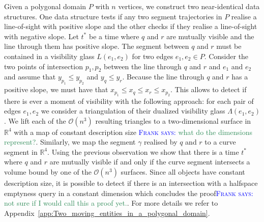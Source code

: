 \documentclass[UKenglish]{lipics-v2019}
\newcommand{\myremark}[4]{\textcolor{blue}{\textsc{#1 #2:}} \textcolor{#4}{\textsf{#3}}}
\newcommand{\frank}[2][says]{\myremark{Frank}{#1}{#2}{SeaGreen}}
\begin{document}
Given a polygonal domain $P$ with $n$ vertices, we construct two near-identical data structures. One data structure tests if any two segment trajectories in $P$ realise a line-of-sight with positive slope and the other checks if they realise a line-of-sight with negative slope. Let $t^*$ be a time where $q$ and $r$ are mutually visible and the line through them has positive slope. The segment between $q$ and $r$ must be contained in a visibility glass $L(e_1, e_2)$ for two edges $e_1, e_2 \in P$. Consider the two points of intersection $p_1, p_2$ between the line through $q$ and $r$ and $e_1$ and $e_2$  and assume that $y_{p_1} \le y_{p_2}$ and $y_q \le y_r$. Because the line through $q$ and $r$ has a positive slope, we must have that $x_{p_1} \le x_{q} \le x_{r} \le x_{p_2}$.
This allows to detect if there is ever a moment of visibility with the
following approach: for each pair of edges $e_1, e_2$ we consider a
triangulation of their dualized visibility glass $\Lambda(e_1,
e_2)$. We lift each of the $\mathcal{O}(n^3)$ resulting triangles to a
two-dimensional surface in $\mathbb{R}^4$ with a map of constant
description size \frank{what do the dimensions represent?}. Similarly,
we map the segment $\gamma$ realised by $q$ and $r$ to a curve segment
in $\mathbb{R}^4$. Using the previous observation we show that there
is a time $t^*$ where $q$ and $r$ are mutually visible if and only if
the curve segment intersects a volume bound by one of the
$\mathcal{O}(n^3)$ surfaces. Since all objects have constant
description size, it is possible to detect if there is an intersection
with a halfspace emptyness query in a constant dimension which
concludes the proof\frank{not sure if I would call this a proof yet.}. For more details we refer to Appendix~\ref{app:Two_moving_entities_in_a_polygonal_domain}.




\end{document}
